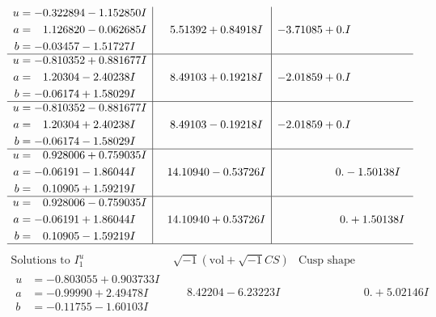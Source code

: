 \documentclass[1p]{elsarticle_modified}
\theoremstyle{definition}
\newcommand{\I}{\sqrt{-1}}
\begin{document}
$$\begin{array}{c|c|c}
\begin{aligned}
u &= -0.322894 - 1.152850 I \\
a &= \phantom{-}1.126820 - 0.062685 I \\
b &= -0.03457 - 1.51727 I\end{aligned}
 & \phantom{-}5.51392 + 0.84918 I & -3.71085 + 0. I\phantom{ +0.000000I} \\ \hline\begin{aligned}
u &= -0.810352 + 0.881677 I \\
a &= \phantom{-}1.20304 - 2.40238 I \\
b &= -0.06174 + 1.58029 I\end{aligned}
 & \phantom{-}8.49103 + 0.19218 I & -2.01859 + 0. I\phantom{ +0.000000I} \\ \hline\begin{aligned}
u &= -0.810352 - 0.881677 I \\
a &= \phantom{-}1.20304 + 2.40238 I \\
b &= -0.06174 - 1.58029 I\end{aligned}
 & \phantom{-}8.49103 - 0.19218 I & -2.01859 + 0. I\phantom{ +0.000000I} \\ \hline\begin{aligned}
u &= \phantom{-}0.928006 + 0.759035 I \\
a &= -0.06191 - 1.86044 I \\
b &= \phantom{-}0.10905 + 1.59219 I\end{aligned}
 & \phantom{-}14.10940 - 0.53726 I & \phantom{-0.000000 } 0. - 1.50138 I \\ \hline\begin{aligned}
u &= \phantom{-}0.928006 - 0.759035 I \\
a &= -0.06191 + 1.86044 I \\
b &= \phantom{-}0.10905 - 1.59219 I\end{aligned}
 & \phantom{-}14.10940 + 0.53726 I & \phantom{-0.000000 -}0. + 1.50138 I\\
 \hline 
 \end{array}$$\newpage$$\begin{array}{c|c|c}  
\text{Solutions to }I^u_{1}& \I (\text{vol} + \sqrt{-1}CS) & \text{Cusp shape}\\
 \hline 
\begin{aligned}
u &= -0.803055 + 0.903733 I \\
a &= -0.99990 + 2.49478 I \\
b &= -0.11755 - 1.60103 I\end{aligned}
 & \phantom{-}8.42204 - 6.23223 I & \phantom{-0.000000 -}0. + 5.02146 I \\ \hline\begin{aligned}

\end{aligned}
\end{array}$$
\end{document}
